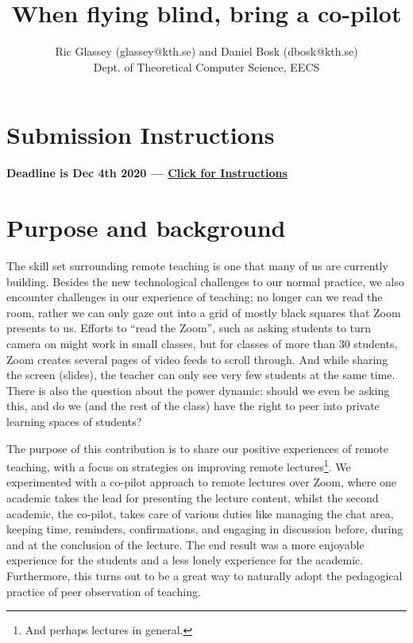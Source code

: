 \documentclass{article}
\title{When flying blind, bring a co-pilot}
\author{Ric Glassey (glassey@kth.se) and Daniel Bosk (dbosk@kth.se)\\
Dept. of Theoretical Computer Science, EECS
}
\date{}
\begin{document}
\maketitle

\section*{Submission Instructions}
\textbf{Deadline is Dec 4th 2020 --- \href{https://intra.kth.se/utbildning/utveckling-och-hogskolepedagogik/kth-sotl/conference-kth/instruktioner-for-bidrag-1.970431}{Click for Instructions}}


\section*{Purpose and background}

The skill set surrounding remote teaching is one that many of us are currently 
building. Besides the new technological challenges to our normal practice, we 
also encounter challenges in our experience of teaching; no longer can we read 
the room, rather we can only gaze out into a grid of mostly black squares that 
Zoom presents to us.
Efforts to \enquote{read the Zoom}, such as asking students to turn camera on 
might work in small classes, but for classes of more than 30 students, Zoom 
creates several pages of video feeds to scroll through.
And while sharing the screen (\eg slides), the teacher can only see very few 
students at the same time.
There is also the question about the power dynamic: should we even be asking 
this, and do we (and the rest of the class) have the right to peer into private 
learning spaces of students?

The purpose of this contribution is to share our positive experiences of remote 
teaching, with a focus on strategies on improving remote lectures\footnote{%
  And perhaps lectures in general.
}.
We experimented with a co-pilot approach to remote lectures over Zoom, where 
one academic takes the lead for presenting the lecture content, whilst the 
second academic, the co-pilot, takes care of various duties like managing the 
chat area, keeping time, reminders, confirmations, and engaging in discussion 
before, during and at the conclusion of the lecture.
The end result was a more enjoyable experience for the students and a less 
lonely experience for the academic.
Furthermore, this turns out to be a great way to naturally adopt the 
pedagogical practice of peer observation of teaching.
\end{document}
